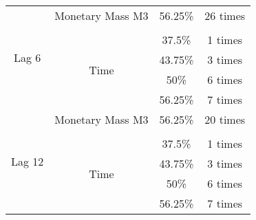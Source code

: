 \begin{table}[t]
\begin{tabular}{lccc}
    \multicolumn{1}{c|}{\multirow{6}{*}{Lag 6}}      & Monetary Mass M3                  & 56.25\%                   & 26 times \\
    \multicolumn{1}{c|}{}                           &                                   &                           &          \\    
    \multicolumn{1}{c|}{}                           & \multirow{4}{*}{Time}             & 37.5\%                    & 1 times \\
    \multicolumn{1}{c|}{}                           &                                   & 43.75\%                   & 3 times \\
    \multicolumn{1}{c|}{}                           &                                   & 50\%                      & 6 times  \\
    \multicolumn{1}{c|}{}                           &                                   & 56.25\%                   & 7 times  \\ \cline{1-4}

    \multicolumn{1}{c|}{\multirow{6}{*}{Lag 12}}      & Monetary Mass M3                  & 56.25\%                   & 20 times \\
    \multicolumn{1}{c|}{}                           &                                   &                           &          \\
    \multicolumn{1}{c|}{}                           & \multirow{4}{*}{Time}             & 37.5\%                    & 1 times \\
    \multicolumn{1}{c|}{}                           &                                   & 43.75\%                   & 3 times \\
    \multicolumn{1}{c|}{}                           &                                   & 50\%                      & 6 times  \\
    \multicolumn{1}{c|}{}                           &                                   & 56.25\%                   & 7 times  \\ 

    \bottomrule
  \end{tabular}
  \label{table:OptimalSplitsCH}
  \vspace{1em}  
\end{table}

